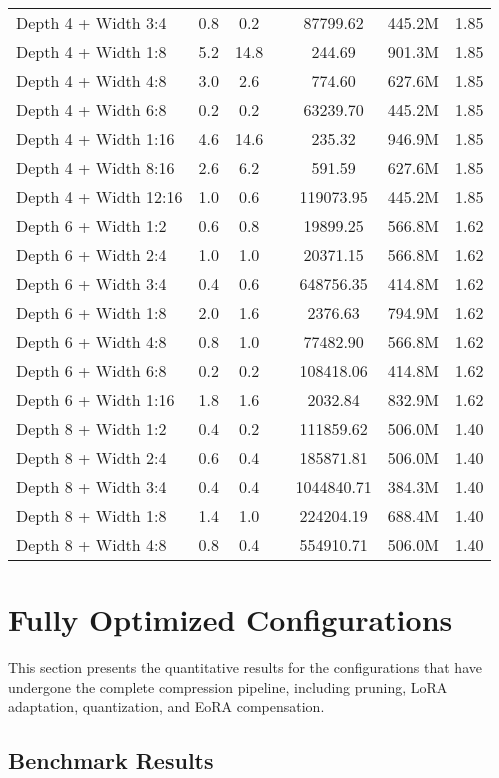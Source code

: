 {\begin{longtable}{lcccccc}
Depth 4 + Width 3:4 & 0.8 & 0.2 & & 87799.62 & 445.2M & 1.85 \\
Depth 4 + Width 1:8 & 5.2 & 14.8 & & 244.69 & 901.3M & 1.85 \\
Depth 4 + Width 4:8 & 3.0 & 2.6 & & 774.60 & 627.6M & 1.85 \\
Depth 4 + Width 6:8 & 0.2 & 0.2 & & 63239.70 & 445.2M & 1.85 \\
Depth 4 + Width 1:16 & 4.6 & 14.6 & & 235.32 & 946.9M & 1.85 \\
Depth 4 + Width 8:16 & 2.6 & 6.2 & & 591.59 & 627.6M & 1.85 \\
Depth 4 + Width 12:16 & 1.0 & 0.6 & & 119073.95 & 445.2M & 1.85 \\
Depth 6 + Width 1:2 & 0.6 & 0.8 & & 19899.25 & 566.8M & 1.62 \\
Depth 6 + Width 2:4 & 1.0 & 1.0 & & 20371.15 & 566.8M & 1.62 \\
Depth 6 + Width 3:4 & 0.4 & 0.6 & & 648756.35 & 414.8M & 1.62 \\
Depth 6 + Width 1:8 & 2.0 & 1.6 & & 2376.63 & 794.9M & 1.62 \\
Depth 6 + Width 4:8 & 0.8 & 1.0 & & 77482.90 & 566.8M & 1.62 \\
Depth 6 + Width 6:8 & 0.2 & 0.2 & & 108418.06 & 414.8M & 1.62 \\
Depth 6 + Width 1:16 & 1.8 & 1.6 & & 2032.84 & 832.9M & 1.62 \\
Depth 8 + Width 1:2 & 0.4 & 0.2 & & 111859.62 & 506.0M & 1.40 \\
Depth 8 + Width 2:4 & 0.6 & 0.4 & & 185871.81 & 506.0M & 1.40 \\
Depth 8 + Width 3:4 & 0.4 & 0.4 & & 1044840.71 & 384.3M & 1.40 \\
Depth 8 + Width 1:8 & 1.4 & 1.0 & & 224204.19 & 688.4M & 1.40 \\
Depth 8 + Width 4:8 & 0.8 & 0.4 & & 554910.71 & 506.0M & 1.40 \\
\end{longtable}
}
\normalsize

\section{Fully Optimized Configurations}

This section presents the quantitative results for the configurations that have undergone the complete compression pipeline, including pruning, LoRA adaptation, quantization, and EoRA compensation.

\subsection{Benchmark Results}

